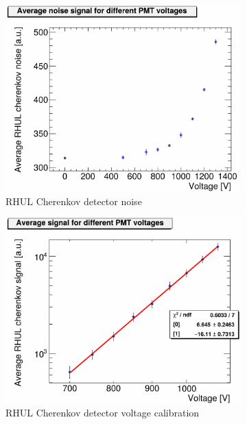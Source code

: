 \begin{figure}
\centering
\begin{subfigure}[b]{0.49\textwidth}
 \centering
\includegraphics[width=0.99\textwidth]{Figures/ATF/AverageNoise_perVoltage_08April.pdf}
\caption{RHUL Cherenkov detector noise}
\end{subfigure}
\hfill
\begin{subfigure}[b]{0.49\textwidth}
  \centering
  \includegraphics[width=\textwidth]{Figures/ATF/VoltageNormalization_totError.pdf}
\caption{RHUL Cherenkov detector voltage calibration}
\end{subfigure}
\caption[RHUL Cherenkov detector calibrations]{
}
\end{figure}
